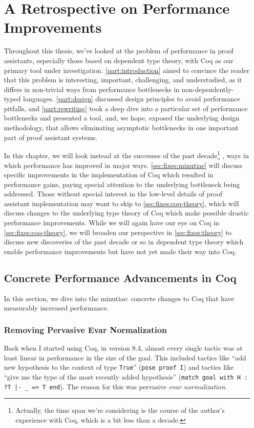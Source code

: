 \chapter{A Retrospective on Performance Improvements}\label{ch:coq-tooling-fixes}\label{ch:retrospective}
Throughout this thesis, we've looked at the problem of performance in proof assistants, especially those based on dependent type theory, with Coq as our primary tool under investigation.
\autoref{part:introduction} aimed to convince the reader that this problem is interesting, important, challenging, and understudied, as it differs in non-trivial ways from performance bottlenecks in non-dependently-typed languages.
\autoref{part:design} discussed design principles to avoid performance pitfalls, and \autoref{part:rewriting} took a deep dive into a particular set of performance bottlenecks and presented a tool, and, we hope, exposed the underlying design methodology, that allows eliminating asymptotic bottlenecks in one important part of proof assistant systems.

In this chapter, we will look instead at the successes of the past decade\footnote{%
  Actually, the time span we're considering is the course of the author's experience with Coq, which is a bit less than a decade.%
}%
, ways in which performance has improved in major ways.
\autoref{sec:fixes:minutiae} will discuss specific improvements in the implementation of Coq which resulted in performance gains, paying special attention to the underlying bottleneck being addressed.
Those without special interest in the low-level details of proof assistant implementation may want to skip to \autoref{sec:fixes:coq-theory}, which will discuss changes to the underlying type theory of Coq which make possible drastic performance improvements.
While we will again have our eye on Coq in \autoref{sec:fixes:coq-theory}, we will broaden our perspective in \autoref{sec:fixes:theory} to discuss new discoveries of the past decade or so in dependent type theory which enable performance improvements but have not yet made their way into Coq.

\section{Concrete Performance Advancements in Coq}\label{sec:fixes:minutiae}
In this section, we dive into the minutiae: concrete changes to Coq that have measurably increased performance.
\subsection{Removing Pervasive Evar Normalization}\label{sec:econstr}
Back when I started using Coq, in version 8.4, almost every single tactic was at least linear in performance in the size of the goal.
This included tactics like ``add new hypothesis to the context of type \texttt{True}'' (\texttt{pose proof I}) and tactics like ``give me the type of the most recently added hypothesis'' (\texttt{match goal with H : ?T |- _ => T end}).
The reason for this was pervasive \emph{evar normalization}.

